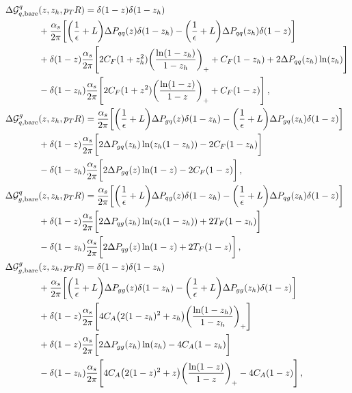 \documentclass[a4paper, 11 pt]{article}
\begin{document}
\begin{align}
\Delta \mathcal{G}^q_{q, \mathrm{bare}} & (z, z_h, p_TR)
=
\delta (1-z) \delta (1-z_h)
\nonumber \\
& +
\frac{\alpha _s}{2 \pi} \bqty{\pqty{\frac{1}{\epsilon} + L} \Delta P_{qq} (z) \delta (1-z_h) - \pqty{\frac{1}{\epsilon} + L} \Delta P_{qq} (z_h) \delta (1-z)}
\nonumber \\
& +
\delta (1-z) \frac{\alpha _s}{2 \pi} \bqty{2 C_F (1 + z_h^2) \pqty{\frac{\ln(1-z_h)}{1-z_h}}_+ + C_F (1-z_h) + 2 \Delta P_{qq} (z_h) \ln(z_h)}
\nonumber \\
& - \delta (1-z_h) \frac{\alpha _s}{2 \pi} \bqty{2 C_F (1+z^2) \pqty{\frac{\ln(1-z)}{1-z}}_+ + C_F (1-z)}
\, , \label{e.bare_collinear_G_qq} \\
\Delta \mathcal{G}^g_{q, \mathrm{bare}} & (z, z_h, p_TR) = \frac{\alpha _s}{2 \pi} \bqty{\pqty{\frac{1}{\epsilon} + L} \Delta P_{gq} (z) \delta (1-z_h) - \pqty{\frac{1}{\epsilon} + L} \Delta P_{gq} (z_h) \delta(1-z)}
\nonumber \\
& +
\delta (1-z) \frac{\alpha _s}{2 \pi} \bigg[2 \Delta P_{gq}(z_h) \ln(z_h (1-z_h)) - 2 C_F (1-z_h) \bigg]
\nonumber \\
& -
\delta (1-z_h) \frac{\alpha _s}{2 \pi} \bigg[2 \Delta P_{gq} (z) \ln(1-z) - 2 C_F (1-z) \bigg]
\, , \label{e.bare_collinear_G_qg} \\
\Delta \mathcal{G}^q_{g, \mathrm{bare}} & (z, z_h, p_TR)
=
\frac{\alpha _s}{2 \pi} \bqty{\pqty{\frac{1}{\epsilon} + L} \Delta P_{qg} (z) \delta (1-z_h) - \pqty{\frac{1}{\epsilon} + L} \Delta P_{qg} (z_h) \delta (1-z)}
\nonumber \\
& +
\delta (1-z) \frac{\alpha _s}{2 \pi} \bigg[2 \Delta P_{qg}(z_h) \ln(z_h (1-z_h)) + 2 T_F (1 - z_h) \bigg]
\nonumber \\
& -
\delta (1-z_h) \frac{\alpha _s}{2 \pi} \bigg[2 \Delta P_{qg} (z) \ln(1-z) + 2 T_F (1-z) \bigg]
\, , \label{e.bare_collinear_G_gq} \\
\Delta \mathcal{G}^g_{g, \mathrm{bare}} & (z, z_h, p_TR)
=
\delta (1-z) \delta (1-z_h)
\nonumber \\
& +
\frac{\alpha _s}{2 \pi} \bqty{\pqty{\frac{1}{\epsilon} + L} \Delta P_{gg} (z) \delta (1-z_h) - \pqty{\frac{1}{\epsilon} + L} \Delta P_{gg} (z_h) \delta (1-z)}
\nonumber \\
& +
\delta (1-z) \frac{\alpha _s}{2 \pi} \bqty{4 C_A \pqty{2 (1-z_h)^2 + z_h} \pqty{\frac{\ln (1-z_h)}{1-z_h}}_+}
\nonumber \\
& +
\delta (1-z) \frac{\alpha _s}{2 \pi} \bigg[2 \Delta P_{gg}(z_h) \ln(z_h) - 4 C_A (1-z_h) \bigg]
\nonumber \\
& -
\delta (1-z_h) \frac{\alpha _s}{2 \pi} \bqty{4 C_A \pqty{2 (1-z)^2 + z} \pqty{\frac{\ln(1-z)}{1-z}}_+ - 4 C_A (1-z)}
\, , \label{e.bare_collinear_G_gg}
\end{align}
\end{document}
